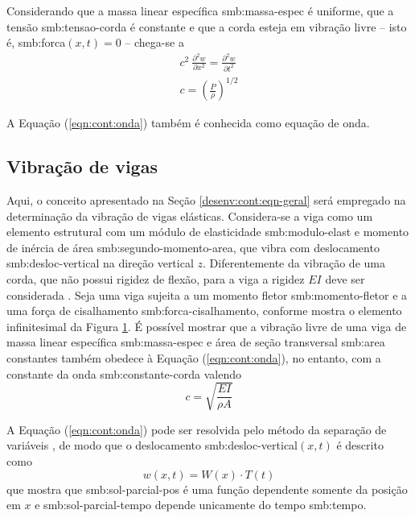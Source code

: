 \documentclass[12pt,openright,oneside,a4paper,
	chapter=TITLE,section=TITLE,
	english,brazil]{abntex2}
\begin{document}
	Considerando que a massa linear específica \gls{smb:massa-espec} é uniforme, que a tensão \gls{smb:tensao-corda} é constante e que a corda esteja em vibração livre -- isto é, \gls{smb:forca}$(x,t) = 0$ -- chega-se a \cite{rao:2008}
	\begin{align}
		\textit{c}^2\:\frac{\partial^2 w}{\partial x^2}=\frac{\partial^2 w}{\partial t^2} \label{eqn:cont:onda}\\
		\textit{c} = \left(\frac{P}{\rho}\right)^{1/2}
	\end{align}
	
	A Equação (\ref{eqn:cont:onda}) também é conhecida como equação de onda. 
	
	\subsection{Vibração de vigas} \label{sec:vigas}
	Aqui, o conceito apresentado na Seção \ref{desenv:cont:eqn-geral} será empregado na determinação da vibração de vigas elásticas. Considera-se a viga como um elemento estrutural com um módulo de elasticidade \gls{smb:modulo-elast} e momento de inércia de área \gls{smb:segundo-momento-area}, que vibra com deslocamento \gls{smb:desloc-vertical} na direção vertical $z$. Diferentemente da vibração de uma corda, que não possui rigidez de flexão, para a viga a rigidez $EI$ deve ser considerada \cite{timoshenko:1974}. Seja uma viga sujeita a um momento fletor \gls{smb:momento-fletor} e a uma força de cisalhamento \gls{smb:forca-cisalhamento}, conforme mostra o elemento infinitesimal da Figura \ref{fig:elemento-viga}. É possível mostrar que a vibração livre de uma viga de massa linear específica \gls{smb:massa-espec} e área de seção transversal \gls{smb:area} constantes também obedece à Equação (\ref{eqn:cont:onda}), no entanto, com a constante da onda \gls{smb:constante-corda} valendo \cite{rao:2008}
	\begin{equation}
		c = \sqrt{\frac{EI}{\rho A}}
	\end{equation}		
	\begin{figure}[b]
		\label{fig:elemento-viga}
	\end{figure}

	A Equação (\ref{eqn:cont:onda}) pode ser resolvida pelo método da separação de variáveis \cite{clark:1972}, de modo que o deslocamento \gls{smb:desloc-vertical}$(x,t)$ é descrito como
	\begin{equation} \label{eqn:cont:sep-variaveis}
		w(x,t) = W(x)\cdot T(t)
	\end{equation}
	que mostra que \gls{smb:sol-parcial-pos} é uma função dependente somente da posição em $x$ e \gls{smb:sol-parcial-tempo} depende unicamente do tempo \gls{smb:tempo}.
	
\end{document}
